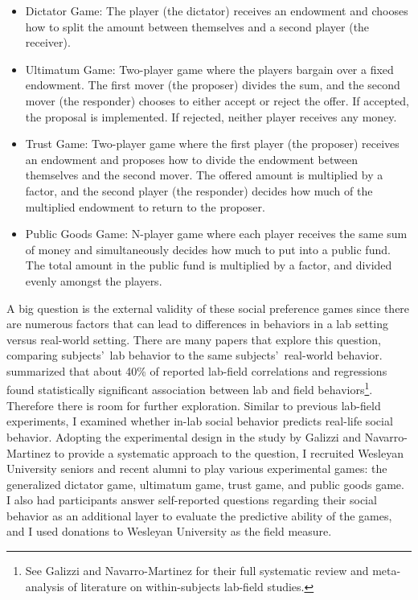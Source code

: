 \documentclass[12pt]{article}
\begin{document}
\begin{itemize}

\item{Dictator Game}: The player (the dictator) receives an endowment and chooses how to split the amount between themselves and a second player (the receiver).
\item{Ultimatum Game}: Two-player game where the players bargain over a fixed endowment. The first mover (the proposer) divides the sum, and the second mover (the responder) chooses to either accept or reject the offer. If accepted, the proposal is implemented. If rejected, neither player receives any money.
\item{Trust Game}: Two-player game where the first player (the proposer) receives an endowment and proposes how to divide the endowment between themselves and the second mover. The offered amount is multiplied by a factor, and the second player (the responder) decides how much of the multiplied endowment to return to the proposer. 
\item{Public Goods Game}: N-player game where each player receives the same sum of money and simultaneously decides how much to put into a public fund. The total amount in the public fund is multiplied by a factor, and divided evenly amongst the players. \end{itemize}

A big question is the external validity of these social preference games since there are numerous factors that can lead to differences in behaviors in a lab setting versus real-world setting. There are many papers that explore this question, comparing subjects\rq \ lab behavior  to the same subjects\rq \ real-world behavior. \cite{galizzi_navarro-martinez_2017} summarized that about 40\% of reported lab-field correlations and regressions found statistically significant association between lab and field behaviors\footnote{See Galizzi and Navarro-Martinez for their full systematic review and meta-analysis of literature on within-subjects lab-field studies.}. Therefore there is room for further exploration. Similar to previous lab-field experiments, I examined whether in-lab social behavior predicts real-life social behavior. Adopting the experimental design in the study by Galizzi and Navarro-Martinez to provide a systematic approach to the question, I recruited Wesleyan University seniors and recent alumni to play various experimental games: the generalized dictator game, ultimatum game, trust game, and public goods game. I also had participants answer self-reported questions regarding their social behavior as an additional layer to evaluate the predictive ability of the games, and I used donations to Wesleyan University as the field measure.
\end{document}
